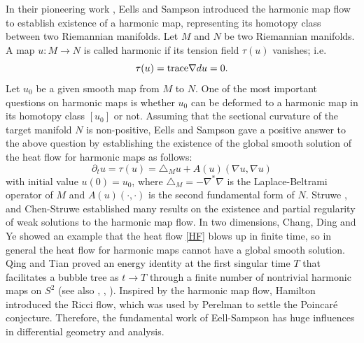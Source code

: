 \documentclass{amsart}
\theoremstyle{definition}
\numberwithin{equation}{section}
\begin{document}
 In their  pioneering work \cite
 {ES},  Eells and Sampson
 introduced
 the  harmonic map    flow  to establish existence of a harmonic map,   representing   its  homotopy class between two Riemannian
 manifolds. Let   $M$ and $N$ be two Riemannian manifolds. A map $u: M\to N$ is called
  harmonic
 if its
 tension field  $\tau(u)$ vanishes; i.e.
\[\tau(u)= {\rm trace} \nabla d u=0.\]
Let  $u_0$ be a given smooth map from $M$ to $N$. One of the most important questions on harmonic maps is whether
 $u_0$  can be deformed to a harmonic map  in its homotopy
class $[u_0]$ or not. Assuming that the sectional curvature of the target manifold  $N$ is non-positive, Eells and Sampson \cite{ES} gave a positive
answer to  the above question by
  establishing the existence of the global smooth solution of the  heat flow for  harmonic maps as follows:
    \begin{equation}\label{HF}
    \partial_t u= \tau(u)=\triangle_M u+A(u)(\nabla u,\nabla u)
\end{equation}
 with initial value $u(0)=u_0$,  where $\triangle_M=-\nabla^*\nabla $ is the Laplace-Beltrami  operator  of $M$
 and $A(u)(\cdot,\cdot)$ is the second fundamental form of $N$.     Struwe \cite{st1}, \cite{st2} and Chen-Struwe \cite{CS} established many results on
  the
 existence and  partial regularity of weak solutions   to the harmonic map flow.   In two dimensions, Chang,   Ding and  Ye  \cite{CDY} showed an example that  the heat
 flow \eqref{HF} blows up in  finite time, so  in general   the heat flow for
 harmonic maps cannot have a global smooth solution.   Qing and Tian  \cite{QT} proved  an energy identity at
 the first singular time $T$  that facilitates   a   bubble tree as $t\to T$  through a finite number of  nontrivial harmonic maps on $S^2$      (see also \cite {Q},   \cite{P},  \cite{DT}).   Inspired by the harmonic
 map flow,  Hamilton  \cite{Ha} introduced  the Ricci flow, which was used by Perelman to settle the Poincar\'e conjecture. Therefore,  the
 fundamental work \cite
 {ES} of Eell-Sampson  has huge influences in differential geometry and analysis.
\end{document}

